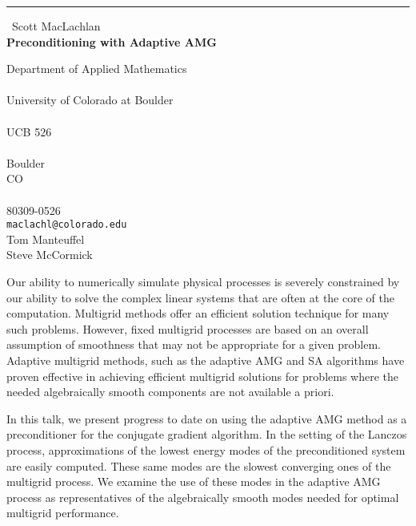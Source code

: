 \documentclass{report}
\begin{document}
\begin{center}
\rule{6in}{1pt} \
{\large Scott MacLachlan \\
{\bf Preconditioning with Adaptive AMG}}

Department of Applied Mathematics \\ \\ University of Colorado at Boulder \\ \\ UCB 526 \\ \\ Boulder \\ CO \\ \\ 80309-0526
\\
{\tt maclachl@colorado.edu}\\
Tom Manteuffel\\
Steve McCormick\end{center}

Our ability to numerically simulate physical processes is severely
constrained by our ability to solve the complex linear systems that are
often at the core of the computation. Multigrid methods offer an
efficient solution technique for many such problems. However, fixed
multigrid processes are based on an overall assumption of smoothness that
may not be appropriate for a given problem. Adaptive multigrid methods,
such as the adaptive AMG and SA algorithms have proven effective in
achieving efficient multigrid solutions for problems where the needed
algebraically smooth components are not available a priori.

In this talk, we present progress to date on using the adaptive AMG
method as a preconditioner for the conjugate gradient algorithm. In the
setting of the Lanczos process, approximations of the lowest energy modes
of the preconditioned system are easily computed. These same modes are
the slowest converging ones of the multigrid process. We examine the use
of these modes in the adaptive AMG process as representatives of the
algebraically smooth modes needed for optimal multigrid performance.
\end{document}

